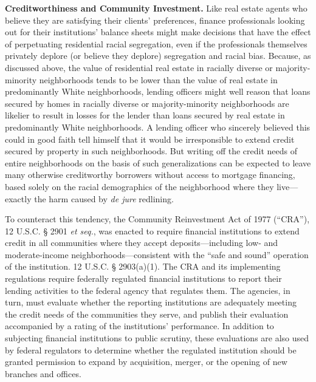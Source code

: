 \begin{questions}[]
\item \textbf{Creditworthiness and Community Investment.} Like real estate
agents who believe they are satisfying their clients' preferences, finance
professionals looking out for their institutions' balance sheets might make
decisions that have the effect of perpetuating residential racial segregation,
even if the professionals themselves privately deplore (or believe they
deplore) segregation and racial bias. Because, as discussed above, the value of
residential real estate in racially diverse or majority-minority neighborhoods
tends to be lower than the value of real estate in predominantly White
neighborhoods, lending officers might well reason that loans secured by homes
in racially diverse or majority-minority neighborhoods are likelier to result
in losses for the lender than loans secured by real estate in predominantly
White neighborhoods. A lending officer who sincerely believed this could in
good faith tell himself that it would be irresponsible to extend credit secured
by property in such neighborhoods. But writing off the credit needs of entire
neighborhoods on the basis of such generalizations can be expected to leave
many otherwise creditworthy borrowers without access to mortgage financing,
based solely on the racial demographics of the neighborhood where they
live---exactly the harm caused by \textit{de jure} redlining. 

To counteract this tendency, the Community Reinvestment Act of 1977 (``CRA''),
12 U.S.C. {\S} 2901 \textit{et seq.}, was enacted to require financial
institutions to extend credit in all communities where they accept
deposits---including low- and moderate-income neighborhoods---consistent with
the ``safe and sound'' operation of the institution. 12 U.S.C. {\S} 2903(a)(1).
The CRA and its implementing regulations require federally regulated financial
institutions to report their lending activities to the federal agency that
regulates them. The agencies, in turn, must evaluate whether the reporting
institutions are adequately meeting the credit needs of the communities they
serve, and publish their evaluation accompanied by a rating of the
institutions' performance. In addition to subjecting financial institutions to
public scrutiny, these evaluations are also used by federal regulators to
determine whether the regulated institution should be granted permission to
expand by acquisition, merger, or the opening of new branches and offices. 
\end{questions}

